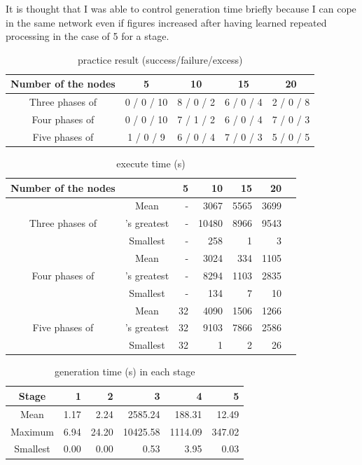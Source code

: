 \documentclass{article}
\begin{document}
It is thought that I was able to control generation time briefly because I can cope in the same network even if figures increased after having learned repeated processing in the case of 5 for a stage.
\begin{table}[htbp]
\caption {practice result (success/failure/excess)}
\label{tbl:result1}
\begin{tabular}{c|cccc}
Number of the nodes &
5&
10&
15&
20\\
\hline \hline
Three phases of &
0 / 0 / 10&
8 / 0 / 2&
6 / 0 / 4&
2 / 0 / 8\\
Four phases of &
0 / 0 / 10&
7 / 1 / 2&
6 / 0 / 4&
7 / 0 / 3\\
Five phases of &
1 / 0 / 9&
6 / 0 / 4&
7 / 0 / 3&
5 / 0 / 5\\
\hline
\end{tabular}
\end{table}
\begin{table}[htbp]
\caption {execute time (s)}
\label{tbl:result2}
\begin{tabular}{c|crrrrr}
Number of the nodes & & 5&
10& 15&
20\\
\hline \hline
&
Mean & -& 3067& 5565& 3699\\
Three phases of &'s greatest & -& 10480& 8966& 9543\\
&
Smallest & -& 258&
1&
3\\
\hline
&
Mean & -& 3024& 334& 1105\\
Four phases of &'s greatest & -& 8294& 1103& 2835\\
&
Smallest & -& 134&
7&
10\\
\hline
&
Mean & 32& 4090& 1506& 1266\\
Five phases of &'s greatest & 32& 9103& 7866& 2586\\
&
Smallest & 32&
1&
2& 26\\
\hline
\end{tabular}
\end{table}
\begin{table}[htbp]
\caption {generation time (s) in each stage}
\label{tbl:result3}
\begin{tabular}{c|rrrrr}
Stage &
1&
2&
3&
4&
5\\
\hline
\hline
Mean &
1.17&
2.24&
2585.24&
188.31&
12.49\\
Maximum &
6.94&
24.20&
10425.58&
1114.09&
347.02\\
Smallest &
0.00&
0.00&
0.53&
3.95&
0.03\\
\hline
\end{tabular}
\end{table}
\end{document}
